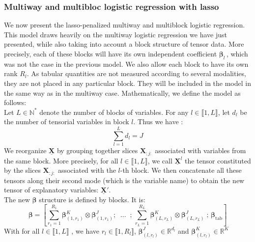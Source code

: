 \documentclass[preprint,12pt]{elsarticle}
\begin{document}
\subsubsection{Multiway and multibloc logistic regression with lasso}

We now present the lasso-penalized multiway and multiblock logistic regression. This model draws heavily on the multiway logistic regression we have just presented, while also taking into account a block structure of tensor data. More precisely, each of these blocks will have its own independent coefficient $\bm{\beta}_l \,$, which was not the case in the previous model. We also allow each block to have its own rank $R_l$. As tabular quantities are not measured according to several modalities, they are not placed in any particular block. They will be included in the model in the same way as in the multiway case. Mathematically, we define the model as follows:\\
\indent Let $L \in \mathbb{N}^{*}$ denote the number of blocks of variables. For any $l \in \llbracket 1, L \rrbracket$, let $d_l$ be the number of tensorial variables in block $l$. Thus we have :
$$\sum\limits_{l = 1}^L d_l = J$$
\indent We reorganize $\underline{\mathbf{X}}$ by grouping together slices $\mathbf{X}_{:j:}$ associated with variables from the same block. More precisely, for all $l \in \llbracket 1, L \rrbracket$, we call  $\underline{\mathbf{X}}^{l}$  the tensor constituted by the slices $\mathbf{X}_{:j:}$ associated with the $l$-th block. We then concatenate all these tensors along their second mode (which is the variable name) to obtain the new tensor of explanatory variables: $\underline{\mathbf{X}}'$.\\[5 pt]
\indent The new $\bm{\beta}$ structure is defined by blocks. It is:
\begin{equation}
    \bm{\beta} = \left[ \sum\limits_{r_1 = 1}^{R_1} \bm{\beta}_{(1,r_1)}^K \otimes \bm{\beta}_{(1,r_1)}^J;   \; \; \hdots  \; \; ;\, \sum\limits_{r_L = 1}^{R_L}\bm{\beta}_{(L,r_L)}^K \otimes \bm{\beta}_{(L,r_L)}^J\; ;\,\bm{\beta}_{\text{tab}}   \right]
\end{equation}
With for all $l \in \llbracket 1,L \rrbracket$ , we have $r_l \in \llbracket 1, R_l\rrbracket$,  $\bm{\beta}_{(l,r_l)}^J \in \mathbb{R}^{d_l}$ and $\bm{\beta}_{(l,r_l)}^K \in \mathbb{R}^{K}$  \\
\end{document}
